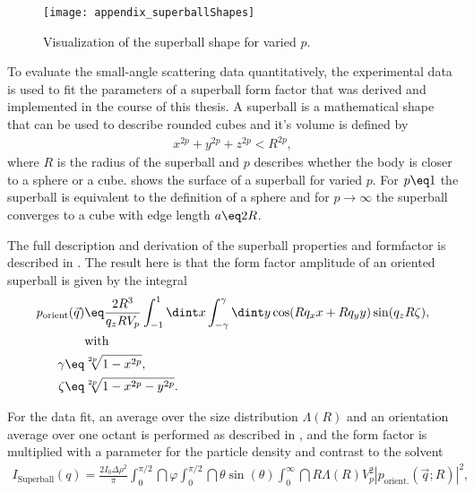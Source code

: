 \documentclass[\main/dresen_thesis.tex]{subfiles}
\begin{document}
  \label{sec:monolayers:nanoparticle:structuralCharacterization}
    \begin{figure}[tb]
      \centering
      \texttt{[image: appendix\_superballShapes]}
      \caption{\label{fig:monolayers:nanoparticle:superballShapes}Visualization of the superball shape for varied $p$.}
    \end{figure}
    To evaluate the small-angle scattering data quantitatively, the experimental data is used to fit the parameters of a superball form factor that was derived and implemented in the course of this thesis.
    A superball is a mathematical shape that can be used to describe rounded cubes and it's volume is defined by
    \begin{align}
      x^{2p} + y^{2p} + z^{2p} < R^{2p},
    \end{align}
    where $R$ is the radius of the superball and $p$ describes whether the body is closer to a sphere or a cube.
     shows the surface of a superball for varied $p$.
    For $p\eq 1$ the superball is equivalent to the definition of a sphere and for $p \rightarrow \infty$ the superball converges to a cube with edge length $a \eq 2R$.

    The full description and derivation of the superball properties and formfactor is described in .
    The result here is that the form factor amplitude of an oriented superball is given by the integral
    \begin{align}
      \begin{split}
        p_\mathrm{orient}(\vec{q}) &\eq \frac{2R^3}{q_z R V_p} \int_{-1}^{1} \dint x \int_{-\gamma}^{\gamma} \dint y \cos(R q_x x + R q_y y)  \sin (q_z R \zeta),\\
        &\mathrm{with}\\
        \gamma \eq& \sqrt[2p]{1-x^{2p}}, \\
        \zeta \eq& \sqrt[2p]{1-x^{2p} -y^{2p}}.
      \end{split}
    \end{align}

    For the data fit, an average over the size distribution $\Lambda(R)$ and an orientation average over one octant is performed as described in , and the form factor is multiplied with a parameter for the particle density and contrast to the solvent
    \begin{align}
      \label{eq:superballFormfactorIntensity}
      I_\mathrm{Superball}(q) = \frac{2 I_0 \Delta \rho^2}{\pi} \int_0^{\pi/2} \dint \varphi \int_0^{\pi/2} \dint \theta \sin (\theta)  \int_0^\infty \dint R \Lambda(R) V_p^2 |p_\mathrm{orient.}(\vec{q}; R)|^2,
    \end{align}
\end{document}

